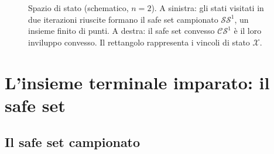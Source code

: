 \documentclass[11pt,a4paper]{article}
\theoremstyle{definition}
\theoremstyle{plain}
\theoremstyle{remark}
\newcommand{\Xc}{\mathcal{X}}
\newcommand{\SSet}{\mathcal{SS}}
\newcommand{\CS}{\mathcal{CS}}
\DeclareMathOperator{\Conv}{Conv}
\begin{document}
\begin{figure}[h]
\centering
\newcommand{\disegnaDati}{%
  \draw[gray] (-0.5,0.3) rectangle (5.7,4.1);
  \node[gray, below left] at (5.7,4.1) {$\Xc$};
  \draw[thick, black!70] (0,2.5) -- (1,3.3) -- (2,3.6) -- (3,3.3) -- (3.8,2.6)
      -- (4.4,2) -- (4.8,1.7) -- (5,1.5);
  \draw[thick, teal] (0,2.5) -- (1.2,2.2) -- (2.3,1.6) -- (3.3,1.1) -- (4.2,1.1)
      -- (4.7,1.3) -- (5,1.5);
  \foreach \p in {(1,3.3),(2,3.6),(3,3.3),(3.8,2.6),(4.4,2),(4.8,1.7)}
      \fill[black!70] \p circle (1.7pt);
  \foreach \p in {(1.2,2.2),(2.3,1.6),(3.3,1.1),(4.2,1.1),(4.7,1.3)}
      \fill[teal] \p circle (1.7pt);
  \fill (0,2.5) circle (2pt) node[left]{$x_S$};
  \fill (5,1.5) circle (2pt) node[right]{$x_F$};
}
\caption{Spazio di stato (schematico, $n=2$). A sinistra: gli stati visitati
in due iterazioni riuscite formano il safe set campionato $\SSet^1$, un
insieme finito di punti. A destra: il safe set convesso $\CS^1$ è il loro
inviluppo convesso. Il rettangolo rappresenta i vincoli di stato $\Xc$.}
\label{fig:safe-set}
\end{figure}

\section{L'insieme terminale imparato: il safe set}\label{sec:safe-set}

\subsection{Il safe set campionato}
\end{document}
